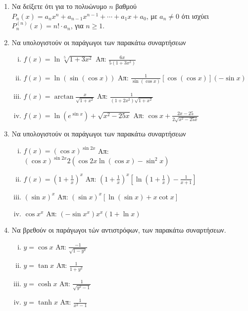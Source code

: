 \begin{enumerate}
	\item Να δείξετε ότι για το πολυώνυμο $n$ βαθμού $ P_{n}(x) =a_{n}x^{n} +
		a_{n-1}x^{n-1} + \cdots + a_{1}x + a_{0} $, με  $ a_{n}\neq 0 $ ότι ισχύει $
		P_{n}^{(n)}(x) = n! \cdot a_{n}$, για  $n\geq 1 $.

	\item Να υπολογιστούν οι παράγωγοι των παρακάτω συναρτήσεων
		\begin{enumerate}[(i)]
			\item $ f(x) = \ln{\sqrt[5]{1+3x^{2}}} $ \hfill Απ: $
				\frac{6x}{5(1+3x^{2})} $
			\item $ f(x) = \ln({\sin({\cos{x}})}) $ \hfill Απ: $
				\frac{1}{\sin{(\cos{x})}} [\cos{(\cos{x})}] (- \sin{x}) $ 
			\item $ f(x) = \arctan \frac{x}{\sqrt{1 + x^{2}}} $ \hfill Απ: $
			\frac{1}{(1+2x^{2})\sqrt{1 + x^{2}}} $
			\item $ f(x) = \ln{(e^{\sin{x}})} + \sqrt{x^{2} - 25x} $ \hfill Απ: $
				\cos{x} + \frac{2x - 25}{2 \sqrt{x^{2} - 25x}}  $  
		\end{enumerate}

	\item  Να υπολογιστούν οι παράγωγοι των παρακάτω συναρτήσεων

	\begin{enumerate}[(i)]
		\item $ f(x) = (\cos{x})^{\sin{2x}} $ \hfill Απ: $
			(\cos{x})^{\sin{2x}} 2(\cos{2x} \ln{(\cos{x})} - \sin^{2}{x}) $
			\item $ f(x) = \left(1 + \frac{1}{x} \right)^{x} $ \hfill Απ: $
				\left(1 + \frac{1}{x}\right)^{x}\left[\ln{(1 + \frac{1}{x})} -
				\frac{1}{x+1}\right] $
			\item $ (\sin{x})^{x} $ \hfill Απ: $ (\sin{x})^{x}[\ln{(\sin{x}
				)} + x \cot{x}] $ 
			\item $ \cos{x}^{x} $ \hfill Απ: $ (- \sin{x^{x}})x^{x} (1 +
				\ln{x}) $
	\end{enumerate}

	\item Να βρεθούν οι παράγωγοι τών αντιστρόφων, των παρακάτω συναρτήσεων.
		\begin{enumerate}[(i)]
			\item $ y = \cos{x} $ \hfill Απ: $ \frac{-1}{\sqrt{1 - y^{2}}} $
			\item $ y = \tan{x} $ \hfill Απ: $ \frac{1}{1 + y^{2}} $
			\item $ y = \cosh{x} $  \hfill Απ: $ \frac{1}{\sqrt{y^{2} - 1}} $
			\item $ y = \tanh{x} $ \hfill Απ: $ \frac{1}{x^{2} - 1} $
		\end{enumerate}


\end{enumerate}
